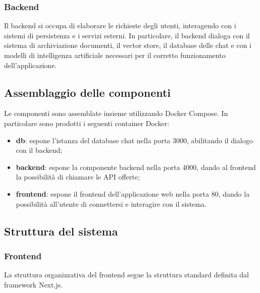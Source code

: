 \documentclass[10pt, a4paper]{article}
\begin{document}
\subsubsection{Backend}
Il backend si occupa di elaborare le richieste degli utenti, interagendo con i sistemi di persistenza e i servizi esterni.
In particolare, il backend dialoga con il sistema di archiviazione documenti, il vector store, il database delle chat e con i modelli di intelligenza artificiale necessari per il corretto funzionamento dell'applicazione.

\subsection{Assemblaggio delle componenti}
Le componenti sono assemblate insieme utilizzando Docker Compose. In particolare sono prodotti i
seguenti container Docker:

\begin{itemize}
    \item \textbf{db}: espone l'istanza del database chat nella porta 3000, abilitando il dialogo con il backend;
    \item \textbf{backend}: espone la componente backend nella porta 4000, dando al frontend la possibilità di chiamare le API offerte;
    \item \textbf{frontend}: espone il frontend dell'applicazione web nella porta 80, dando la possibilità all'utente di connettersi e interagire con il sistema.
\end{itemize}

\subsection{Struttura del sistema}

\subsubsection{Frontend}
La struttura organizzativa del frontend segue la struttura standard definita dal framework Next.js.
\end{document}
